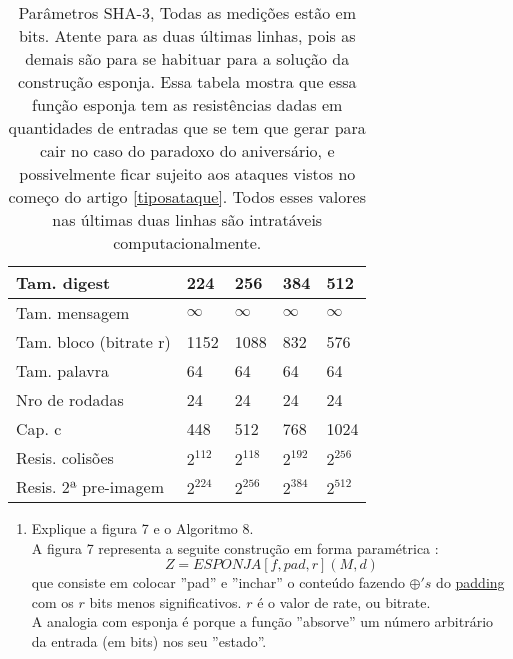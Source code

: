 \documentclass[12pt, a4paper]{article}
\begin{document}
\begin{enumerate}
\begin{enumerate}
\begin{table}[ht!]
\centering
\label{sha3tablepar}
\begin{tabular}{|l|l|l|l|l|}
\hline Tam. digest & 224 & 256 & 384 & 512 \\
\hline Tam. mensagem & $\infty$ & $\infty$ & $\infty$ & $\infty$ \\
\hline Tam. bloco (bitrate r) & 1152 & 1088 & 832 & 576 \\
\hline Tam. palavra & 64 & 64 & 64 & 64 \\
\hline Nro de rodadas & 24 & 24 & 24 & 24 \\
\hline Cap. c & 448 & 512 & 768 & 1024 \\
\hline Resis. colisões & $2^{112}$ & $2^{118}$ & $2^{192}$ & $2^{256}$ \\
\hline Resis. 2ª pre-imagem & $2^{224}$ & $2^{256}$ & $2^{384}$ & $2^{512}$ \\
\hline
\end{tabular}
\caption{Parâmetros SHA-3, Todas as medições estão em bits. Atente para as duas
últimas linhas, pois as demais são para se habituar para a solução da construção
esponja. Essa tabela mostra que essa função esponja tem as resistências dadas em
quantidades de entradas que se tem que gerar para cair no caso do paradoxo do
aniversário, e possivelmente ficar sujeito aos ataques vistos no começo do
artigo \ref{tiposataque}. Todos esses valores nas últimas duas linhas são
intratáveis computacionalmente.}
\end{table}

  \begin{enumerate}
    \item Explique a figura 7 e o Algoritmo 8.\\

    A figura 7 representa a seguite construção em forma paramétrica
    \cite{gbertoni}: $$Z = ESPONJA[f, pad, r](M, d)$$ que consiste em colocar
    ''pad'' e ''inchar'' o conteúdo fazendo $\oplus's$ do \underline{padding}
    com os $r$ bits menos significativos. $r$ é o valor de rate, ou bitrate.\\

    A analogia com esponja é porque a função ''absorve'' um número arbitrário
    da entrada (em bits) nos seu ''estado''.\\


\end{enumerate}
\end{enumerate}
\end{enumerate}
\end{document}
